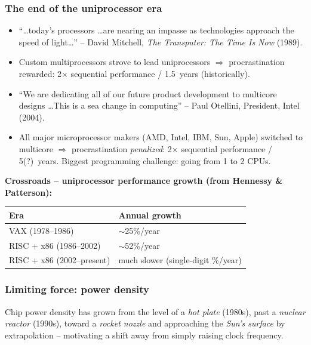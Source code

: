 \subsubsection{The end of the uniprocessor era}

\begin{itemize}
  \item ``\dots today's processors \dots are nearing an impasse as
  technologies approach the speed of light\dots'' -- David Mitchell, \emph{The
  Transputer: The Time Is Now} (1989).
  \item Custom multiprocessors strove to lead uniprocessors
  $\Rightarrow$ procrastination rewarded: 2$\times$ sequential
  performance / 1.5~years (historically).
  \item ``We are dedicating all of our future product development to
  multicore designs \dots This is a sea change in computing'' -- Paul
  Otellini, President, Intel (2004).
  \item All major microprocessor makers (AMD, Intel, IBM, Sun, Apple)
  switched to multicore $\Rightarrow$ procrastination \emph{penalized}: 2$\times$
  sequential performance / 5(?)~years. Biggest programming challenge: going
  from 1 to 2 CPUs.
\end{itemize}

\textbf{Crossroads -- uniprocessor performance growth (from Hennessy \&
Patterson):}
\begin{center}
\begin{tabular}{@{}ll@{}}
\toprule
Era & Annual growth \\
\midrule
VAX (1978--1986)       & $\sim$25\%/year \\
RISC + x86 (1986--2002) & $\sim$52\%/year \\
RISC + x86 (2002--present) & much slower (single-digit \%/year) \\
\bottomrule
\end{tabular}
\end{center}

\subsubsection{Limiting force: power density}
Chip power density has grown from the level of a \emph{hot plate}
(1980s), past a \emph{nuclear reactor} (1990s), toward a \emph{rocket
nozzle} and approaching the \emph{Sun's surface} by extrapolation --
motivating a shift away from simply raising clock frequency.

\begin{center}
\end{center}

